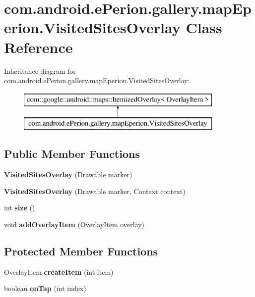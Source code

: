 \section{com.\-android.\-e\-Perion.\-gallery.\-map\-Eperion.\-Visited\-Sites\-Overlay Class Reference}
\label{classcom_1_1android_1_1e_perion_1_1gallery_1_1map_eperion_1_1_visited_sites_overlay}
Inheritance diagram for com.\-android.\-e\-Perion.\-gallery.\-map\-Eperion.\-Visited\-Sites\-Overlay\-:\begin{figure}[H]
\begin{center}
\leavevmode
\includegraphics[height=2.000000cm]{classcom_1_1android_1_1e_perion_1_1gallery_1_1map_eperion_1_1_visited_sites_overlay}
\end{center}
\end{figure}
\subsection*{Public Member Functions}
\begin{DoxyCompactItemize}
\item 
{\bf Visited\-Sites\-Overlay} (Drawable marker)
\item 
{\bf Visited\-Sites\-Overlay} (Drawable marker, Context context)
\item 
int {\bfseries size} ()\label{classcom_1_1android_1_1e_perion_1_1gallery_1_1map_eperion_1_1_visited_sites_overlay_a8a4e1fd25d0eb5bc3131a7dc244df187}

\item 
void {\bf add\-Overlay\-Item} (Overlay\-Item overlay)
\end{DoxyCompactItemize}
\subsection*{Protected Member Functions}
\begin{DoxyCompactItemize}
\item 
Overlay\-Item {\bfseries create\-Item} (int item)\label{classcom_1_1android_1_1e_perion_1_1gallery_1_1map_eperion_1_1_visited_sites_overlay_a21fcebf68c2b26af0ff777af00865b1f}

\item 
boolean {\bfseries on\-Tap} (int index)\label{classcom_1_1android_1_1e_perion_1_1gallery_1_1map_eperion_1_1_visited_sites_overlay_a1d21514722560b2e870f29271f3a7cf5}

\end{DoxyCompactItemize}


